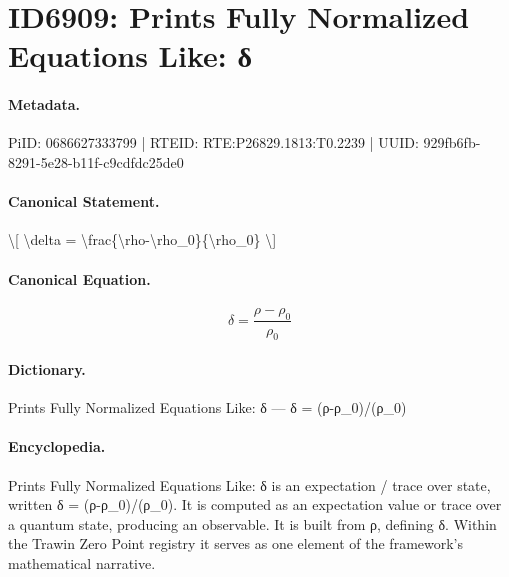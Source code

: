 \section*{ID6909: Prints Fully Normalized Equations Like: δ}
\paragraph{Metadata.}
PiID: 0686627333799 | RTEID: RTE:P26829.1813:T0.2239 | UUID: 929fb6fb-8291-5e28-b11f-c9cdfdc25de0

\paragraph{Canonical Statement.}
\textbackslash{}[ \textbackslash{}delta = \textbackslash{}frac\{\textbackslash{}rho-\textbackslash{}rho\_0\}\{\textbackslash{}rho\_0\} \textbackslash{}]

\paragraph{Canonical Equation.}
\[
\delta = \frac{\rho-\rho_0}{\rho_0}
\]

\paragraph{Dictionary.}
Prints Fully Normalized Equations Like: δ — δ = (ρ-ρ\_0)/(ρ\_0)

\paragraph{Encyclopedia.}
Prints Fully Normalized Equations Like: δ is an expectation / trace over state, written δ = (ρ-ρ\_0)/(ρ\_0). It is computed as an expectation value or trace over a quantum state, producing an observable. It is built from ρ, defining δ. Within the Trawin Zero Point registry it serves as one element of the framework's mathematical narrative.
